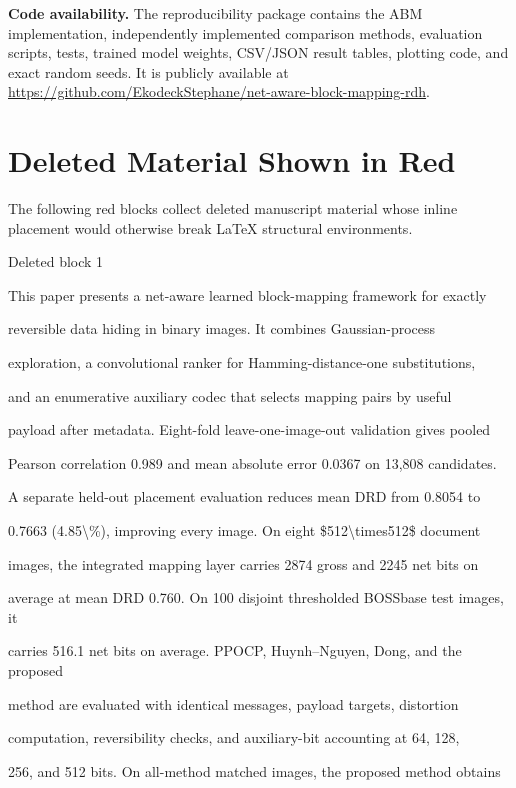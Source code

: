 \documentclass[a4paper,fleqn]{cas-dc}
\newenvironment{RevisionDeletion}{%
  \par\begingroup\color{revisionred}\footnotesize\ttfamily
  \setlength{\parindent}{0pt}\setlength{\parskip}{1pt}\obeyspaces
}{\par\endgroup}
\begin{document}
\medskip
\noindent\textbf{Code availability.}
The reproducibility package contains the ABM implementation, independently
implemented comparison methods, evaluation scripts, tests, trained model
weights, CSV/JSON result tables, plotting code, and exact random seeds. It is
publicly available at
\url{https://github.com/EkodeckStephane/net-aware-block-mapping-rdh}.


\clearpage
\section*{Deleted Material Shown in Red}
The following red blocks collect deleted manuscript material whose inline placement would otherwise break LaTeX structural environments.

\begin{RevisionDeletion}
Deleted block 1\par
This paper presents a net-aware learned block-mapping framework for exactly\par
reversible data hiding in binary images. It combines Gaussian-process\par
exploration, a convolutional ranker for Hamming-distance-one substitutions,\par
and an enumerative auxiliary codec that selects mapping pairs by useful\par
payload after metadata. Eight-fold leave-one-image-out validation gives pooled\par
Pearson correlation 0.989 and mean absolute error 0.0367 on 13,808 candidates.\par
A separate held-out placement evaluation reduces mean DRD from 0.8054 to\par
0.7663 (4.85\textbackslash{}\%), improving every image. On eight \$512\textbackslash{}times512\$ document\par
images, the integrated mapping layer carries 2874 gross and 2245 net bits on\par
average at mean DRD 0.760. On 100 disjoint thresholded BOSSbase test images, it\par
carries 516.1 net bits on average. PPOCP, Huynh--Nguyen, Dong, and the proposed\par
method are evaluated with identical messages, payload targets, distortion\par
computation, reversibility checks, and auxiliary-bit accounting at 64, 128,\par
256, and 512 bits. On all-method matched images, the proposed method obtains\par

\end{RevisionDeletion}
\end{document}
